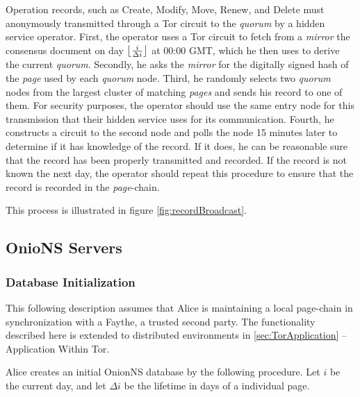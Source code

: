 Operation records, such as Create, Modify, Move, Renew, and Delete must anonymously transmitted through a Tor circuit to the \emph{quorum} by a hidden service operator. First, the operator uses a Tor circuit to fetch from a \emph{mirror} the consensus document on day $ \floor[\big]{\frac{i}{\Delta i}} $ at 00:00 GMT, which he then uses to derive the current \emph{quorum}. Secondly, he asks the \emph{mirror} for the digitally signed hash of the \emph{page} used by each \emph{quorum} node. Third, he randomly selects two \emph{quorum} nodes from the largest cluster of matching \emph{pages} and sends his record to one of them. For security purposes, the operator should use the same entry node for this transmission that their hidden service uses for its communication. Fourth, he constructs a circuit to the second node and polls the node 15 minutes later to determine if it has knowledge of the record. If it does, he can be reasonable sure that the record has been properly transmitted and recorded. If the record is not known the next day, the operator should repeat this procedure to ensure that the record is recorded in the \emph{page}-chain.

This process is illustrated in figure \ref{fig:recordBroadcast}.

\subsection{OnioNS Servers}

\subsubsection{Database Initialization}

This following description assumes that Alice is maintaining a local page-chain in synchronization with a Faythe, a trusted second party. The functionality described here is extended to distributed environments in \ref{sec:TorApplication} -- Application Within Tor.


Alice creates an initial OnionNS database by the following procedure. Let $ i $ be the current day, and let $ \Delta i $ be the lifetime in days of a individual page.

